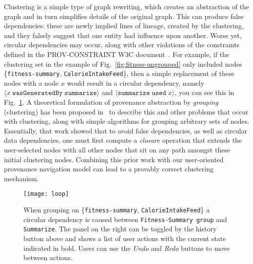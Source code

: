 Clustering is a simple type of graph rewriting, which creates an abstraction of the graph and in turn simplifies details of the original graph. This can produce false dependencies: these are newly implied lines of lineage, created by the clustering, and they falsely suggest that one entity had influence upon another. 
Worse yet, circular dependencies may occur, along with other violations of the constraints defined in the PROV-CONSTRAINT W3C document~\cite{w3c-prov-constraints}. For example, if the clustering set in the example of Fig.~\ref{fig:fitness-ungrouped} only included nodes \{\texttt{fitness-summary}, \texttt{CalorieIntakeFeed}\},  then a simple replacement of these nodes with a node $x$ would result in a circular dependency, namely $\langle x \; \mathtt{wasGeneratedBy} \; \mathtt{summarize}\rangle$ and $\langle \texttt{summarize} \; \texttt{used} \; x \rangle$, you can see this in Fig.~\ref{fig:loop}.
A theoretical formulation of provenance abstraction by \textit{grouping} (clustering) has been proposed in~\cite{Missier2014} to describe this and other problems that occur with clustering, along with simple algorithms for grouping arbitrary sets of nodes. 
Essentially, that work showed that to avoid false dependencies, as well as circular data dependencies, one must first compute a \textit{closure} operation that extends the user-selected nodes with all other nodes that sit on any path amongst these initial clustering nodes.
Combining this prior work with our user-oriented provenance navigation model can lead to a provably correct clustering mechanism. 

\begin{figure}[h]
	\centering
	\texttt{[image: loop]}
	\caption{When grouping on \{\texttt{fitness-summary}, \texttt{CalorieIntakeFeed}\} a circular dependency is caused between \texttt{Fitness-Summary group} and \texttt{Summarize}. The panel on the right can be toggled by the history button above and shows a list of user actions with the current state indicated in bold. Users can use the \textit{Undo} and \textit{Redo} buttons to move between actions.}
	\label{fig:loop}
\end{figure}


